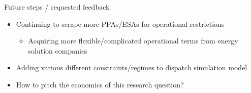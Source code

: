 \documentclass{beamer}
\begin{document}
\begin{frame}{Future steps / requested feedback}
    \begin{itemize}
        \item Continuing to scrape more PPAs/ESAs for operational restrictions
        \begin{itemize}
            \item Acquiring more flexible/complicated operational terms from energy solution companies
        \end{itemize}
        \item Adding various different constraints/regimes to dispatch simulation model
        \item How to pitch the economics of this research question?
    \end{itemize}
\end{frame}
\end{document}
